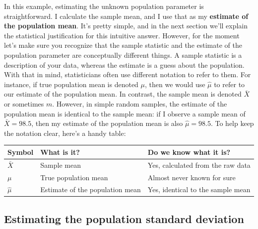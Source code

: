 \documentclass[
]{book}
\begin{document}
In this example, estimating the unknown population parameter is straightforward. I calculate the sample mean, and I use that as my \textbf{estimate of the population mean}. It's pretty simple, and in the next section we'll explain the statistical justification for this intuitive answer. However, for the moment let's make sure you recognize that the sample statistic and the estimate of the population parameter are conceptually different things. A sample statistic is a description of your data, whereas the estimate is a guess about the population. With that in mind, statisticians often use different notation to refer to them. For instance, if true population mean is denoted \(\mu\), then we would use \(\hat\mu\) to refer to our estimate of the population mean. In contrast, the sample mean is denoted \(\bar{X}\) or sometimes \(m\). However, in simple random samples, the estimate of the population mean is identical to the sample mean: if I observe a sample mean of \(\bar{X} = 98.5\), then my estimate of the population mean is also \(\hat\mu = 98.5\). To help keep the notation clear, here's a handy table:

\begin{longtable}[]{@{}
  >{\raggedright\arraybackslash}p{}
  >{\raggedright\arraybackslash}p{}
  >{\raggedright\arraybackslash}p{}@{}}
\toprule\noalign{}
\begin{minipage}[b]{\linewidth}\raggedright
Symbol
\end{minipage} & \begin{minipage}[b]{\linewidth}\raggedright
What is it?
\end{minipage} & \begin{minipage}[b]{\linewidth}\raggedright
Do we know what it is?
\end{minipage} \\
\midrule\noalign{}
\endhead
\bottomrule\noalign{}
\endlastfoot
\(\bar{X}\) & Sample mean & Yes, calculated from the raw data \\
\(\mu\) & True population mean & Almost never known for sure \\
\(\hat{\mu}\) & Estimate of the population mean & Yes, identical to the sample mean \\
\end{longtable}

\subsection{Estimating the population standard deviation}\label{estimating-the-population-standard-deviation}
\end{document}
